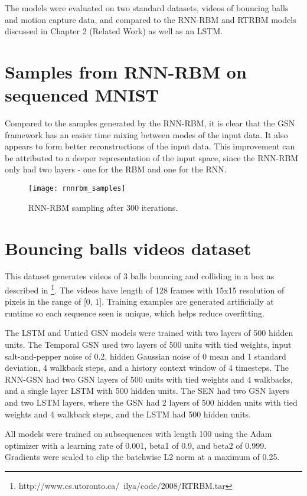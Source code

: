 The models were evaluated on two standard datasets, videos of bouncing balls and motion capture data, and compared to the RNN-RBM and RTRBM models discussed in Chapter 2 (Related Work) as well as an LSTM.

\section{Samples from RNN-RBM on sequenced MNIST}

Compared to the samples generated by the RNN-RBM, it is clear that the GSN framework has an easier time mixing between modes of the input data. It also appears to form better reconstructions of the input data. This improvement can be attributed to a deeper representation of the input space, since the RNN-RBM only had two layers - one for the RBM and one for the RNN.

\begin{figure}[h!]
  \centering
    \texttt{[image: rnnrbm\_samples]}
\caption{RNN-RBM sampling after 300 iterations.}
\end{figure}

\section{Bouncing balls videos dataset}

This dataset generates videos of 3 balls bouncing and colliding in a box as described in \cite{lewandowski12}\footnote{http://www.cs.utoronto.ca/~ilya/code/2008/RTRBM.tar}. The videos have length of 128 frames with 15x15 resolution of pixels in the range of [0, 1]. Training examples are generated artificially at runtime so each sequence seen is unique, which helps reduce overfitting.

The LSTM and Untied GSN models were trained with two layers of 500 hidden units. The Temporal GSN used two layers of 500 units with tied weights, input salt-and-pepper noise of 0.2, hidden Gaussian noise of 0 mean and 1 standard deviation, 4 walkback steps, and a history context window of 4 timesteps. The RNN-GSN had two GSN layers of 500 units with tied weights and 4 walkbacks, and a single layer LSTM with 500 hidden units. The SEN had two GSN layers and two LSTM layers, where the GSN had 2 layers of 500 hidden units with tied weights and 4 walkback steps, and the LSTM had 500 hidden units.

All models were trained on subsequences with length 100 using the Adam optimizer with a learning rate of 0.001, beta1 of 0.9, and beta2 of 0.999. Gradients were scaled to clip the batchwise L2 norm at a maximum of 0.25.


